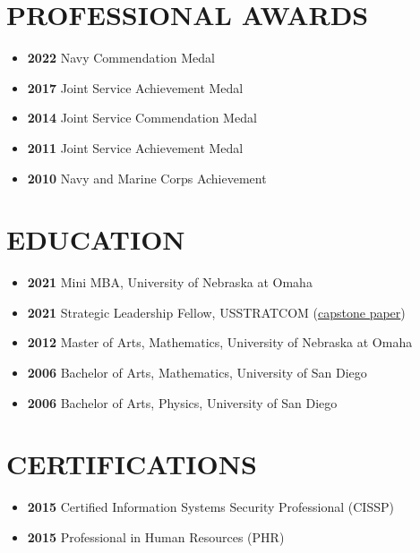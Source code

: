 \documentclass[10pt]{article}
\def\tightlist{}
\begin{document}
\hypertarget{professional-awards}{%
\section{PROFESSIONAL AWARDS}\label{professional-awards}}

\begin{itemize}
\tightlist
\item
  \textbf{2022} Navy Commendation Medal
\item
  \textbf{2017} Joint Service Achievement Medal
\item
  \textbf{2014} Joint Service Commendation Medal
\item
  \textbf{2011} Joint Service Achievement Medal
\item
  \textbf{2010} Navy and Marine Corps Achievement
\end{itemize}

\hypertarget{education}{%
\section{EDUCATION}\label{education}}

\begin{itemize}
\tightlist
\item
  \textbf{2021} Mini MBA, University of Nebraska at Omaha
\item
  \textbf{2021} Strategic Leadership Fellow, USSTRATCOM
  (\href{https://resume.jasonwohlgemuth.com/SFLP_capstone.pdf}{capstone
  paper})
\item
  \textbf{2012} Master of Arts, Mathematics, University of Nebraska at
  Omaha
\item
  \textbf{2006} Bachelor of Arts, Mathematics, University of San Diego
\item
  \textbf{2006} Bachelor of Arts, Physics, University of San Diego
\end{itemize}

\hypertarget{certifications}{%
\section{CERTIFICATIONS}\label{certifications}}

\begin{itemize}
\tightlist
\item
  \textbf{2015} Certified Information Systems Security Professional
  (CISSP)
\item
  \textbf{2015} Professional in Human Resources (PHR)
\end{itemize}
\end{document}
